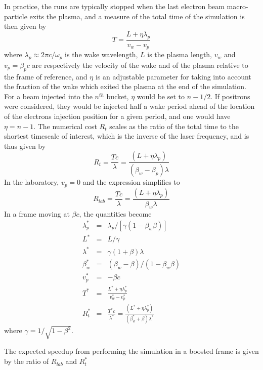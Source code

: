 In practice, the runs are typically stopped when the last electron beam macro-particle exits the plasma, and a measure of the total time of the simulation is then given by
%
\begin{equation}
T=\frac{L+\eta \lambda_p}{v_w-v_p}
\end{equation}
%
where $\lambda_p\approx 2\pi c/\omega_p$ is the wake wavelength, $L$ is the plasma length, $v_w$ and $v_p=\beta_p c$ are respectively the velocity of the wake and of the plasma relative to the frame of reference, and $\eta$ is an adjustable parameter for taking into account the fraction of the wake which exited the plasma at the end of the simulation.
For a beam injected into the $n^{th}$ bucket, $\eta$ would be set to $n-1/2$. If positrons were considered, they would be injected half a wake period ahead of the location of the electrons injection position for a given period, and one would have $\eta=n-1$. The numerical cost $R_t$ scales as the ratio of the total time to the shortest timescale of interest, which is the inverse of the laser frequency, and is thus given by
%
\begin{equation}
R_t=\frac{T c}{\lambda}=\frac{\left(L+\eta \lambda_p\right)}{\left(\beta_w-\beta_p\right) \lambda}
\end{equation}
%
In the laboratory, $v_p=0$ and the expression simplifies to
%
\begin{equation}
R_{lab}=\frac{T c}{\lambda}=\frac{\left(L+\eta \lambda_p\right)}{\beta_w \lambda}
\end{equation}
%
In a frame moving at $\beta c$, the quantities become
\begin{eqnarray}
\lambda_p^*&=&\lambda_p/\left[\gamma \left(1-\beta_w \beta\right)\right] \\
L^*&=&L/\gamma \\
\lambda^*&=& \gamma\left(1+\beta\right) \lambda\\
\beta_w^*&=&\left(\beta_w-\beta\right)/\left(1-\beta_w\beta\right) \\
v_p^*&=&-\beta c \\
T^*&=&\frac{L^*+\eta \lambda_p^*}{v_w^*-v_p^*} \\
R_t^*&=&\frac{T^* c}{\lambda^*} = \frac{\left(L^*+\eta \lambda_p^*\right)}{\left(\beta_w^*+\beta\right) \lambda^*}
\end{eqnarray}
where $\gamma=1/\sqrt{1-\beta^2}$.

The expected speedup from performing the simulation in a boosted frame is given by the ratio of $R_{lab}$ and $R_t^*$

